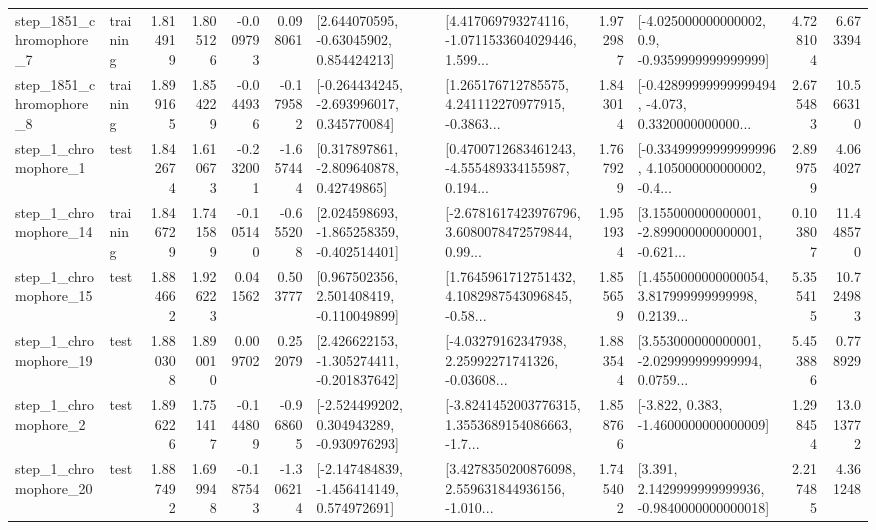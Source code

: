 \begin{tabular}{llrrrrllrlrr}
  step\_1851\_chromophore\_7 &  training &      1.814919 &    1.805126 &     -0.009793 &  0.098061 &     [2.644070595, -0.63045902, 0.854424213] &  [4.417069793274116, -1.0711533604029446, 1.599... &       1.972987 &     [-4.025000000000002, 0.9, -0.9359999999999999] &            4.728104 &          6.673394 \\
  step\_1851\_chromophore\_8 &  training &      1.899165 &    1.854229 &     -0.044936 & -0.179582 &   [-0.264434245, -2.693996017, 0.345770084] &  [1.265176712785575, 4.241112270977915, -0.3863... &       1.843014 &  [-0.42899999999999494, -4.073, 0.3320000000000... &            2.675483 &         10.566310 \\
     step\_1\_chromophore\_1 &      test &      1.842674 &    1.610673 &     -0.232001 & -1.657444 &     [0.317897861, -2.809640878, 0.42749865] &  [0.4700712683461243, -4.555489334155987, 0.194... &       1.767929 &  [-0.33499999999999996, 4.105000000000002, -0.4... &            2.899759 &          4.064027 \\
    step\_1\_chromophore\_14 &  training &      1.846729 &    1.741589 &     -0.105140 & -0.655208 &   [2.024598693, -1.865258359, -0.402514401] &  [-2.6781617423976796, 3.6080078472579844, 0.99... &       1.951934 &  [3.155000000000001, -2.899000000000001, -0.621... &            0.103807 &         11.448570 \\
    step\_1\_chromophore\_15 &      test &      1.884662 &    1.926223 &      0.041562 &  0.503777 &    [0.967502356, 2.501408419, -0.110049899] &  [1.7645961712751432, 4.1082987543096845, -0.58... &       1.855659 &  [1.4550000000000054, 3.817999999999998, 0.2139... &            5.355415 &         10.724983 \\
    step\_1\_chromophore\_19 &      test &      1.880308 &    1.890010 &      0.009702 &  0.252079 &   [2.426622153, -1.305274411, -0.201837642] &  [-4.03279162347938, 2.25992271741326, -0.03608... &       1.883544 &  [3.553000000000001, -2.029999999999994, 0.0759... &            5.453886 &          0.778929 \\
     step\_1\_chromophore\_2 &      test &      1.896226 &    1.751417 &     -0.144809 & -0.968605 &   [-2.524499202, 0.304943289, -0.930976293] &  [-3.8241452003776315, 1.3553689154086663, -1.7... &       1.858766 &               [-3.822, 0.383, -1.4600000000000009] &            1.298454 &         13.013772 \\
    step\_1\_chromophore\_20 &      test &      1.887492 &    1.699948 &     -0.187543 & -1.306214 &   [-2.147484839, -1.456414149, 0.574972691] &  [3.4278350200876098, 2.559631844936156, -1.010... &       1.745402 &   [3.391, 2.1429999999999936, -0.9840000000000018] &            2.217485 &          4.361248 \\

\end{tabular}
